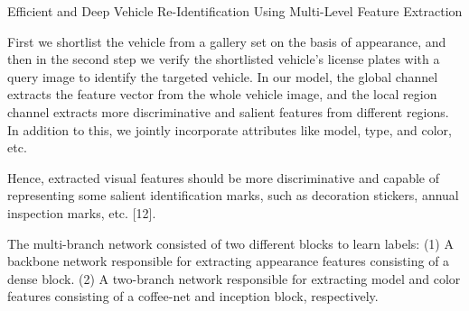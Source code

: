 Efficient and Deep Vehicle Re-Identification Using
Multi-Level Feature Extraction

First we shortlist the vehicle from a gallery set on the
basis of  appearance, and then in the second step we verify the shortlisted vehicle’s license plates with
a query image to identify the targeted vehicle. In our model, the global channel extracts the feature
vector from the whole vehicle image, and the local region channel extracts more discriminative and
 salient features from different regions. In addition to this, we jointly incorporate attributes like model,
type, and color, etc.


Hence, extracted visual
features should be more discriminative and capable of representing some salient identification marks,
such as decoration stickers, annual inspection marks, etc. [12].

The multi-branch network
consisted of two different blocks to learn labels: (1) A backbone network responsible for extracting
appearance features consisting of a dense block. (2) A two-branch network responsible for extracting
model and color features consisting of a coffee-net and inception block, respectively.


